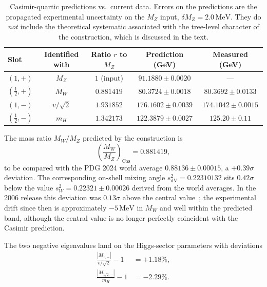 \documentclass[twocolumn,aps,prd,floatfix,nofootinbib,superscriptaddress,10pt]{article}
\newcommand{\MW}{M_W}
\newcommand{\MZ}{M_Z}
\newcommand{\mH}{m_H}
\newcommand{\sW}{s^2_W}
\newcommand{\sdV}{s^2_{\mathrm{dV}}}
\newcommand{\MeV}{\,\mathrm{MeV}}
\begin{document}
\begin{table}[t]
\centering
\caption{Casimir-quartic predictions vs.\ current data. Errors on the predictions are the propagated experimental uncertainty on the $\MZ$ input, $\delta\MZ=2.0\MeV$. They do {\em not} include the theoretical systematic associated with the tree-level character of the construction, which is discussed in the text.}
\label{tab:compare}
\begin{tabular}{lcccc}
\toprule
Slot & Identified with & Ratio $r$ to $\MZ$ & Prediction (GeV) & Measured (GeV) \\
\midrule
$(1,+)$ & $\MZ$ & $1$ (input) & $91.1880\pm 0.0020$ & --- \\
$(\tfrac12,+)$ & $\MW$ & $0.881419$ & $80.3724\pm 0.0018$ & $80.3692\pm 0.0133$ \\
$(1,-)$ & $v/\sqrt{2}$ & $1.931852$ & $176.1602\pm 0.0039$ & $174.1042\pm 0.0015$ \\
$(\tfrac12,-)$ & $\mH$ & $1.342173$ & $122.3879\pm 0.0027$ & $125.20\pm 0.11$ \\
\bottomrule
\end{tabular}
\end{table}

The mass ratio $\MW/\MZ$ predicted by the construction is
\begin{equation}
\left(\frac{\MW}{\MZ}\right)_{\!\!\mathrm{Cas}} = 0.881419,
\end{equation}
to be compared with the PDG 2024 world average $0.88136\pm0.00015$, a $+0.39\sigma$ deviation. The corresponding on-shell mixing angle $\sdV=0.22310132$ sits $0.42\sigma$ below the value $\sW=0.22321\pm 0.00026$ derived from the world averages. In the 2006 release this deviation was $0.13\sigma$ above the central value~\cite{Rivero2006}; the experimental drift since then is approximately $-5\MeV$ in $\MW$ and well within the predicted band, although the central value is no longer perfectly coincident with the Casimir prediction.

The two negative eigenvalues land on the Higgs-sector parameters with deviations
\begin{align}
\frac{|M_{1,-}|}{v/\sqrt{2}}-1 &= +1.18\%, \\
\frac{|M_{1/2,-}|}{\mH}-1 &= -2.29\%.
\end{align}
\end{document}
